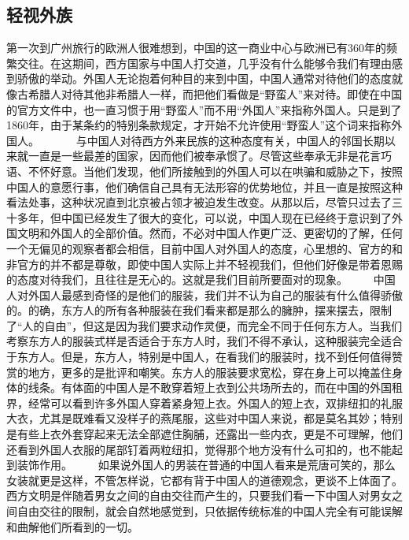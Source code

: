 \documentclass[12pt,oneside]{book}
\begin{document}
\begin{common-format}
\chapter{轻视外族}
第一次到广州旅行的欧洲人很难想到，中国的这一商业中心与欧洲已有360年的频繁交往。在这期间，西方国家与中国人打交道，几乎没有什么能够令我们有理由感到骄傲的举动。外国人无论抱着何种目的来到中国，中国人通常对待他们的态度就像古希腊人对待其他非希腊人一样，而把他们看做是“野蛮人”来对待。即使在中国的官方文件中，也一直习惯于用“野蛮人”而不用“外国人”来指称外国人。只是到了1860年，由于某条约的特别条款规定，才开始不允许使用“野蛮人”这个词来指称外国人。 
　　　与中国人对待西方外来民族的这种态度有关，中国人的邻国长期以来就一直是一些最差的国家，因而他们被奉承惯了。尽管这些奉承无非是花言巧语、不怀好意。当他们发现，他们所接触到的外国人可以在哄骗和威胁之下，按照中国人的意愿行事，他们确信自己具有无法形容的优势地位，并且一直是按照这种看法处事，这种状况直到北京被占领才被迫发生改变。从那以后，尽管只过去了三十多年，但中国已经发生了很大的变化，可以说，中国人现在已经终于意识到了外国文明和外国人的全部价值。然而，不必对中国人作更广泛、更密切的了解，任何一个无偏见的观察者都会相信，目前中国人对外国人的态度，心里想的、官方的和非官方的并不都是尊敬，即使中国人实际上并不轻视我们，但他们好像是带着恩赐的态度对待我们，且往往是无心的。这就是我们目前所要面对的现象。 
　　中国人对外国人最感到奇怪的是他们的服装，我们并不认为自己的服装有什么值得骄傲的。的确，东方人的所有各种服装在我们看来都是那么的臃肿，摆来摆去，限制了“人的自由”，但这是因为我们要求动作灵便，而完全不同于任何东方人。当我们考察东方人的服装式样是否适合于东方人时，我们不得不承认，这种服装完全适合于东方人。但是，东方人，特别是中国人，在看我们的服装时，找不到任何值得赞赏的地方，更多的是批评和嘲笑。东方人的服装要求宽松，穿在身上可以掩盖住身体的线条。有体面的中国人是不敢穿着短上衣到公共场所去的，而在中国的外国租界，经常可以看到许多外国人穿着紧身短上衣。外国人的短上衣，双排纽扣的礼服大衣，尤其是既难看又没样子的燕尾服，这些对中国人来说，都是莫名其妙；特别是有些上衣外套穿起来无法全部遮住胸脯，还露出一些内衣，更是不可理解，他们还看到外国人衣服的尾部钉着两粒纽扣，觉得那个地方没有什么可扣的，也不能起到装饰作用。 
　　如果说外国人的男装在普通的中国人看来是荒唐可笑的，那么女装就更是这样，不管怎样说，它都有背于中国人的道德观念，更谈不上体面了。西方文明是伴随着男女之间的自由交往而产生的，只要我们看一下中国人对男女之间自由交往的限制，就会自然地感觉到，只依据传统标准的中国人完全有可能误解和曲解他们所看到的一切。 

\end{common-format}
\end{document}
